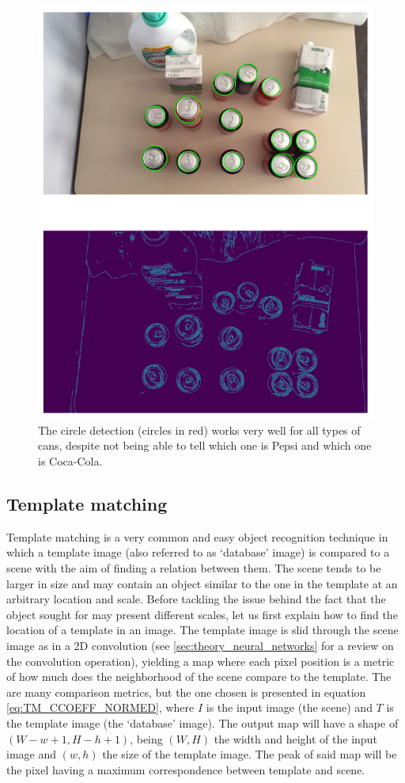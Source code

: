\documentclass[../main.tex]{subfiles}
\begin{document}
\begin{figure}[H]
    \centering
    \includegraphics[width=0.8\linewidth]{images/hough_circles_testbench.png}
    \caption{The circle detection (circles in red) works very well for all types of cans, despite not being able to tell which one is Pepsi and which one is Coca-Cola.}
    \label{fig:hough_circles_testbench}
\end{figure}

\subsection{Template matching} \label{sec:template_matching}
Template matching is a very common and easy object recognition technique in which a template image (also referred to as `database' image) is compared to a scene with the aim of finding a relation between them. The scene tends to be larger in size and may contain an object similar to the one in the template at an arbitrary location and scale. Before tackling the issue behind the fact that the object sought for may present different scales, let us first explain how to find the location of a template in an image. The template image is slid through the scene image as in a 2D convolution (see \ref{sec:theory_neural_networks} for a review on the convolution operation), yielding a map where each pixel position is a metric of how much does the neighborhood of the scene compare to the template. The are many comparison metrics, but the one chosen is presented in equation \ref{eq:TM_CCOEFF_NORMED}, where $I$ is the input image (the scene) and $T$ is the template image (the `database' image). The output map will have a shape of $\left(W-w+1, H-h+1\right)$, being $\left(W,H\right)$ the width and height of the input image and $\left(w,h\right)$ the size of the template image. The peak of said map will be the pixel having a maximum correspondence between template and scene.
\end{document}
